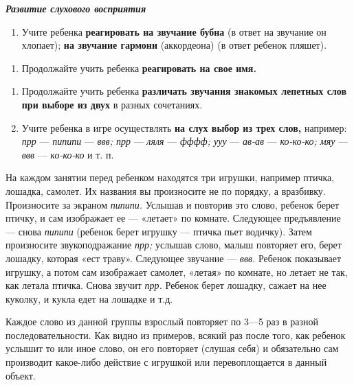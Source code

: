 \documentclass[a5paper]{book}
\renewcommand{\emph}[1]{\textit{#1}}
\begin{document}
\emph{\textbf{Развитие слухового восприятия}}


\begin{enumerate}
\def\labelenumi{\arabic{enumi}.}
\item
  
  Учите ребенка \textbf{реагировать на звучание бубна} (в ответ на
  звучание он хлопает); \textbf{на звучание гармони} (аккордеона) (в
  ответ ребенок пляшет).
  
\end{enumerate}

\begin{enumerate}
\def\labelenumi{\arabic{enumi}.}
\item
  
  Продолжайте учить ребенка \textbf{реагировать на свое имя.}
  
\end{enumerate}

\begin{enumerate}
\def\labelenumi{\arabic{enumi}.}
\setcounter{enumi}{1}
\item
  
  Продолжайте учить ребенка \textbf{различать звучания знакомых лепетных
  слов при выборе из двух} в разных сочетаниях.
  
\item
  
  Учите ребенка в игре осуществлять \textbf{на слух выбор из трех слов,}
  например: \emph{прр} --- \emph{пипипи} --- \emph{ввв; прр} ---
  \emph{ляля} --- \emph{фффф; ууу} --- \emph{ав-ав} --- \emph{ко-ко-ко;
  мяу} --- \emph{ввв} --- \emph{ко-ко-ко} и т. п.
  
\end{enumerate}


На каждом занятии перед ребенком находятся три игрушки, например птичка,
лошадка, самолет. Их названия вы произносите не по порядку, а вразбивку.
Произносите за экраном \emph{пипипи.} Услышав и повторив это слово,
ребенок берет птичку, и сам изображает ее --- «летает» по комнате.
Следующее предъявление --- снова \emph{пипипи} (ребенок берет игрушку
--- птичка пьет водичку). Затем произносите звукоподражание \emph{прр;}
услышав слово, малыш повторяет его, берет лошадку, которая «ест траву».
Следующее звучание --- \emph{ввв.} Ребенок показывает игрушку, а потом
сам изображает самолет, «летая» по комнате, но летает не так, как летала
птичка. Снова звучит \emph{прр.} Ребенок берет лошадку, сажает на нее
куколку, и кукла едет на лошадке и т.д.

Каждое слово из данной группы взрослый повторяет по 3---5 раз в разной
последовательности. Как видно из примеров, всякий раз после того, как
ребенок услышит то или иное слово, он его повторяет (слушая себя) и
обязательно сам производит какое-либо действие с игрушкой или
перевоплощается в данный объект.
\end{document}
